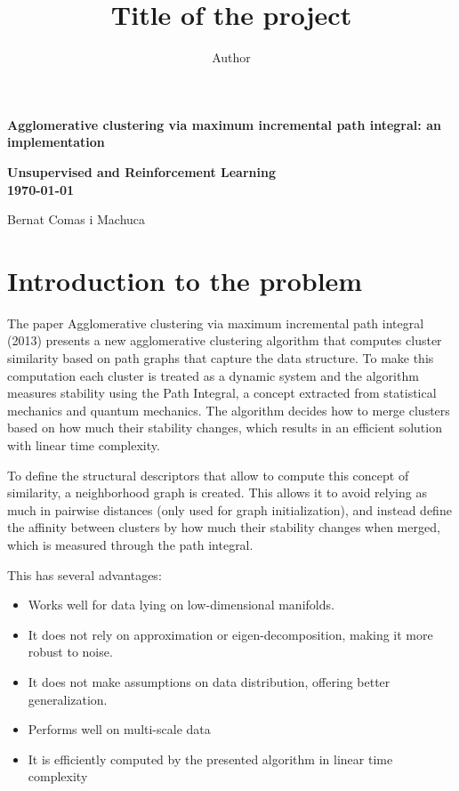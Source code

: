 \documentclass[
	10pt,
	parskip=half-,	
	paper=a4,
	english
	]{scrartcl}
\title{Title of the project}
\author{Author}
\date{\newdateformat{monthyeardate}{%
  \monthname[\THEMONTH], \THEYEAR}}
\date{}
\begin{document}
\begin{titlepage}
    \centering
    \vspace*{\fill}

    {\Huge\bfseries Agglomerative clustering via maximum incremental path integral: an implementation}
    \vspace{1cm}
    
    {\bfseries Unsupervised and Reinforcement Learning\\} %
    \vspace{0.5cm}
    {\bfseries \today}
    \vspace{1.5cm}

    {\Large Bernat Comas i Machuca}
    \vspace{0.5cm}

    {\Large \date{}}

    \vspace*{\fill} %

\end{titlepage}

\newpage			
\tableofcontents
\newpage
\section {Introduction to the problem}

The paper Agglomerative clustering via maximum incremental path integral (2013) \cite{citation1} presents a new agglomerative clustering algorithm that computes cluster similarity based on path graphs that capture the data structure. To make this computation each cluster is treated as a dynamic system and the algorithm measures stability using the Path Integral, a concept extracted from statistical mechanics and quantum mechanics. The algorithm decides how to merge clusters based on how much their stability changes, which results in an efficient solution with linear time complexity.

To define the structural descriptors that allow to compute this concept of similarity, a neighborhood graph is created. This allows it to avoid relying as much in pairwise distances (only used for graph initialization), and instead define the affinity between clusters by how much their stability changes when merged, which is measured through the path integral.

This has several advantages:

\begin{itemize}
    \item Works well for data lying on low-dimensional manifolds.
    \item It does not rely on approximation or eigen-decomposition, making it more robust to noise.
    \item It does not make assumptions on data distribution, offering better generalization.
    \item Performs well on multi-scale data
    \item It is efficiently computed by the presented algorithm in linear time complexity
\end{itemize}
\end{document}
